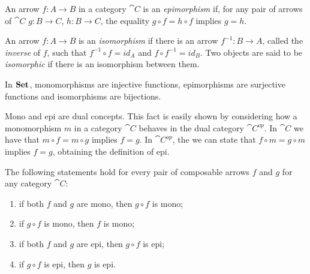 



\begin{definition}[Epimorphism]\label{def:epi}
    An arrow $f: A\rightarrow B$ in a category $\cat{C}$ is an \emph{epimorphism} if, for any pair of arrows of $\cat{C}$ $g : B \rightarrow C$, $h: B \rightarrow C$, the equality $g \circ f = h \circ f$ implies $g = h$.
\end{definition}

\begin{definition}[Isomorphism]\label{def:iso}
    An arrow $f:A \rightarrow B$ is an \emph{isomorphism} if there is an arrow $f^{-1}:B \rightarrow A$, called the \emph{inverse} of $f$, such that $f^{-1}\circ f = id_{A}$ and $f \circ f^{-1} = id_{B}$. Two objects are said to be \emph{isomorphic} if there is an isomorphism between them.
\end{definition}

\begin{example}
    In $\mathbf{Set}$, monomorphisms are injective functions, epimorphisms are surjective functions and isomorphisms are bijections.
\end{example}

\begin{remark}
    Mono and epi are dual concepts. This fact is easily shown by considering how a monomorphism $m$ in a category $\cat C$ behaves in the dual category $\cat C^{op}$.
    In $\cat C$ we have that $m \circ f = m \circ g$ implies $f = g$. In $\cat C^{op}$, the we can state that $f \circ m = g \circ m$ implies $f = g$, obtaining the definition of epi. 
\end{remark}

\begin{prop}\label{prop:epi_mono_prop}
    The following statements hold for every pair of composable arrows $f$ and $g$ for any category $\cat C$:
    \begin{enumerate}
        \item if both $f$ and $g$ are mono, then $g \circ f$ is mono;
        \item if $g \circ f$ is mono, then $f$ is mono;
        \item if both $f$ and $g$ are epi, then $g \circ f$ is epi;
        \item if $g \circ f$ is epi, then $g$ is epi.
    \end{enumerate}
\end{prop}

